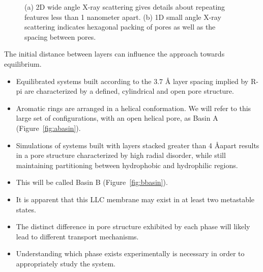 \documentclass{article}
\newcommand{\angstrom}{\textup{\AA}}
\begin{document}
\begin{figure}[!ht]
\begin{subfigure}[t]{0.43\linewidth}
		\caption{}\label{fig:SAXS}
	\end{subfigure}
	\caption{(a) 2D wide angle X-ray scattering gives details about repeating
	features less than 1 nanometer apart. (b) 1D small angle X-ray scattering 
	indicates hexagonal packing of pores as well as the spacing between pores.}\label{fig:SWAXS}
  \end{figure}
  
  The initial distance between layers can influence the approach towards
  equilibrium. 
  \begin{itemize}
  	\item Equilibrated systems built according to the 3.7 \angstrom 
	layer spacing implied by R-pi are characterized by a defined, cylindrical and
	open pore structure.
	\item Aromatic rings are arranged in a helical conformation.%
        We will refer to this large set of configurations, with an open helical pore, as Basin A (Figure~\ref{fig:abasin}).
	\item Simulations of systems built with layers stacked greater than 4 
	\angstrom apart results in a pore structure characterized by high radial 
	disorder, while still maintaining partitioning between hydrophobic and 
	hydrophilic regions.
	\item This will be called Basin B (Figure~\ref{fig:bbasin}).
	\item It is apparent that this LLC membrane may exist in at least two metastable states.
	\item The distinct difference in pore structure exhibited by each phase will 
	likely lead to different transport mechanisms.
	\item Understanding which phase exists experimentally is necessary in order
	to appropriately study the system.  %
  \end{itemize}
  
\end{document}
